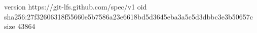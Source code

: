 version https://git-lfs.github.com/spec/v1
oid sha256:27f32606318f55660e5b7586a23e6618bd5d3645eba3a5c5d3dbbc3e3b50657c
size 43864
